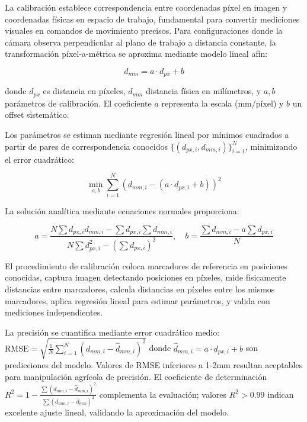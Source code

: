 La calibración establece correspondencia entre coordenadas píxel en imagen y coordenadas físicas en espacio de trabajo, fundamental para convertir mediciones visuales en comandos de movimiento precisos. Para configuraciones donde la cámara observa perpendicular al plano de trabajo a distancia constante, la transformación píxel-a-métrica se aproxima mediante modelo lineal afín:

\begin{equation}
d_{mm} = a \cdot d_{px} + b
\end{equation}

donde $d_{px}$ es distancia en píxeles, $d_{mm}$ distancia física en milímetros, y $a, b$ parámetros de calibración. El coeficiente $a$ representa la escala (mm/píxel) y $b$ un offset sistemático.

Los parámetros se estiman mediante regresión lineal por mínimos cuadrados a partir de pares de correspondencia conocidos $\{(d_{px,i}, d_{mm,i})\}_{i=1}^{N}$, minimizando el error cuadrático:

\begin{equation}
\min_{a,b} \sum_{i=1}^{N} (d_{mm,i} - (a \cdot d_{px,i} + b))^2
\end{equation}

La solución analítica mediante ecuaciones normales proporciona:

\begin{equation}
a = \frac{N\sum d_{px,i}d_{mm,i} - \sum d_{px,i}\sum d_{mm,i}}{N\sum d_{px,i}^2 - (\sum d_{px,i})^2}, \quad b = \frac{\sum d_{mm,i} - a\sum d_{px,i}}{N}
\end{equation}

El procedimiento de calibración coloca marcadores de referencia en posiciones conocidas, captura imagen detectando posiciones en píxeles, mide físicamente distancias entre marcadores, calcula distancias en píxeles entre los mismos marcadores, aplica regresión lineal para estimar parámetros, y valida con mediciones independientes.

La precisión se cuantifica mediante error cuadrático medio: $\text{RMSE} = \sqrt{\frac{1}{N}\sum_{i=1}^{N}(d_{mm,i} - \hat{d}_{mm,i})^2}$ donde $\hat{d}_{mm,i} = a \cdot d_{px,i} + b$ son predicciones del modelo. Valores de RMSE inferiores a 1-2mm resultan aceptables para manipulación agrícola de precisión. El coeficiente de determinación $R^2 = 1 - \frac{\sum (d_{mm,i} - \hat{d}_{mm,i})^2}{\sum (d_{mm,i} - \bar{d}_{mm})^2}$ complementa la evaluación; valores $R^2 > 0.99$ indican excelente ajuste lineal, validando la aproximación del modelo.
